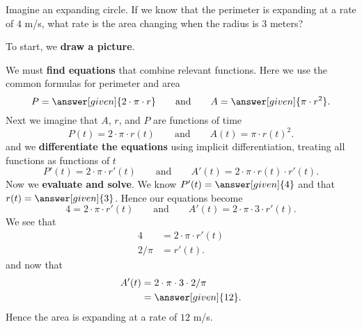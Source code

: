 \documentclass{ximera}
\begin{document}
\begin{example}
  Imagine an expanding circle. If we know that the perimeter is
  expanding at a rate of $4$ m/s, what rate is the area changing
  when the radius is $3$ meters?
  \begin{explanation}
    To start, we \textbf{draw a picture}.
    \begin{image}
    \end{image}
    We must \textbf{find equations} that combine relevant
    functions. Here we use the common formulas for perimeter and area
    \[
    P = \answer[given]{2\cdot \pi \cdot r}
    \qquad\text{and}\qquad
    A = \answer[given]{\pi \cdot r^2}.
    \]
    Next we imagine that $A$, $r$, and $P$ are functions of time
    \[
    P(t) = 2\cdot \pi \cdot r(t)
    \qquad\text{and}\qquad
    A(t) = \pi \cdot r(t)^2.
    \]
    and we \textbf{differentiate the equations} using implicit
    differentiation, treating all functions as functions of $t$
    \[
    P'(t) = 2\cdot \pi\cdot r'(t)
    \qquad\text{and}\qquad
    A'(t) = 2\cdot \pi\cdot r(t) \cdot r'(t).
    \]
    Now we \textbf{evaluate and solve}. We know $P'(t) =
    \answer[given]{4}$ and that $r(t) = \answer[given]{3}$. Hence our
    equations become
    \[
    4 = 2\cdot \pi\cdot r'(t)
    \qquad\text{and}\qquad
    A'(t) = 2\cdot \pi\cdot 3 \cdot r'(t).
    \]
    We see that
    \begin{align*}
      4 &= 2\cdot \pi\cdot r'(t)\\
      2/\pi &= r'(t).
    \end{align*}
    and now that
    \begin{align*}
      A'(t) &= 2\cdot \pi\cdot 3 \cdot 2/\pi\\
      &=\answer[given]{12}.
    \end{align*}
    Hence the area is expanding at a rate of $12$ m/s.
  \end{explanation}
\end{example}


\end{document}
